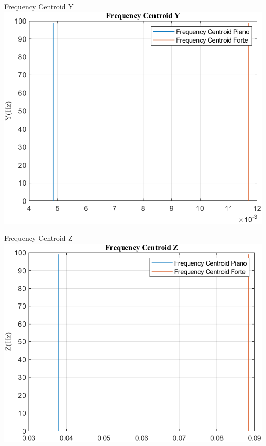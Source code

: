 	\begin{frame}{{Frequency Centroid Y}}
		\centering\includegraphics[height=.8\textheight]{figure/Vel/Trasformata/Frequency CentroidY}
	\end{frame}
	
	\begin{frame}{{Frequency Centroid Z}}
		\centering\includegraphics[height=.8\textheight]{figure/Vel/Trasformata/Frequency CentroidZ}
	\end{frame}
	
